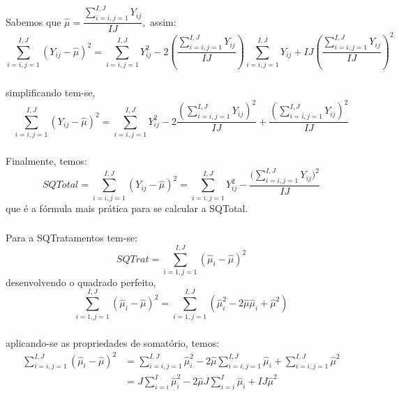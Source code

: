 \documentclass[14pt,aspectratio=1610]{beamer}
\begin{document}
\begin{frame}{}
\frametitle{}
\begin{block}{}
\justifying
Sabemos que $\hat{\mu}=\dfrac{{\displaystyle \sum_{i=i,j=1}^{I,J}Y_{ij}}}{IJ},$ assim:
$$
{\displaystyle \sum_{i=i,j=1}^{I,J}(Y_{ij}-\hat{\mu})^{2}}=
{\displaystyle \sum_{i=i,j=1}^{I,J}Y_{ij}^{2}-2\left(\dfrac{{\displaystyle \sum_{i=i,j=1}^{I,J}Y_{ij}}}{IJ}\right)\sum_{i=i,j=1}^{I,J}Y_{ij}+IJ\left(\dfrac{{\displaystyle \sum_{i=i,j=1}^{I,J}Y_{ij}}}{IJ}\right)^{2}}
$$
\end{block}
\end{frame}

\begin{frame}{}
\frametitle{}
\begin{block}{}
\justifying
simplificando tem-se,
$$
{\displaystyle \sum_{i=i,j=1}^{I,J}(Y_{ij}-\hat{\mu})^{2}}=
{\displaystyle \sum_{i=i,j=1}^{I,J}Y_{ij}^{2}-2\dfrac{\left({\displaystyle \sum_{i=i,j=1}^{I,J}Y_{ij}}\right)^{2}}{IJ}+\dfrac{\left({\displaystyle \sum_{i=i,j=1}^{I,J}Y_{ij}}\right)^{2}}{IJ}}
$$
\end{block}
\end{frame}

\begin{frame}{}
\frametitle{}
\begin{block}{}
\justifying
Finalmente, temos:
$$
SQTotal={\displaystyle \sum_{i=i,j=1}^{I,J}(Y_{ij}-\hat{\mu})^{2}}=
{\displaystyle \sum_{i=i,j=1}^{I,J}Y_{ij}^{2}-\dfrac{\Biggl({\displaystyle \sum_{i=i,j=1}^{I,J}Y_{ij}}\Biggl)^{2}}{IJ}}
$$
que é a fórmula mais prática para se calcular a SQTotal.
\end{block}
\end{frame}

\begin{frame}{}
\frametitle{}
\begin{block}{}
\justifying
Para a SQTratamentos tem-se:
$$SQTrat={\displaystyle \sum_{i=1,j=1}^{I,J}(\hat{\mu}_{i}-\hat{\mu})^{2}}$$\pause
desenvolvendo o quadrado perfeito,
$${\displaystyle \sum_{i=1,j=1}^{I,J}(\hat{\mu}_{i}-\hat{\mu})^{2}}=
{\displaystyle \sum_{i=1,j=1}^{I,J}(\hat{\mu}_{i}^{2}-2\hat{\mu}\hat{\mu}_{i}+\hat{\mu}^{2})}$$
\end{block}
\end{frame}

\begin{frame}{}
\frametitle{}
\begin{block}{}
\justifying
aplicando-se as propriedades de somatório, temos:
\begin{align}
{\displaystyle \sum_{i=i,j=1}^{I,J}(\hat{\mu}_{i}-\hat{\mu})^{2}}&=
{\displaystyle \sum_{i=i,j=1}^{I,J}\hat{\mu}_{i}^{2}-2\hat{\mu}\sum_{i=i,j=1}^{I,J}\hat{\mu}_{i}+\sum_{i=i,j=1}^{I,J}\hat{\mu}^{2}}\\
&={\displaystyle J\sum_{i=i}^{I}\hat{\mu}_{i}^{2}-2\hat{\mu}J\sum_{i=i}^{I}\hat{\mu}_{i}+IJ\hat{\mu}^{2}}
\end{align}
\end{block}
\end{frame}
\end{document}
